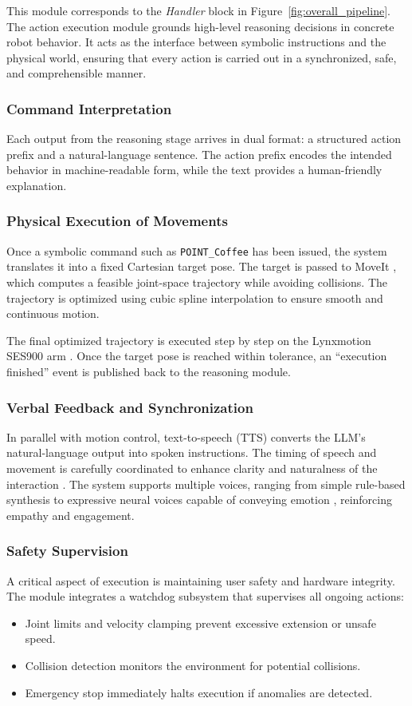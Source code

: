 This module corresponds to the \textit{Handler} block in Figure~\ref{fig:overall_pipeline}. The action execution module grounds high-level reasoning decisions in concrete robot behavior. It acts as the interface between symbolic instructions and the physical world, ensuring that every action is carried out in a synchronized, safe, and comprehensible manner.

\subsubsection{Command Interpretation}
Each output from the reasoning stage arrives in dual format: a structured action prefix and a natural-language sentence. The action prefix encodes the intended behavior in machine-readable form, while the text provides a human-friendly explanation.

\subsubsection{Physical Execution of Movements}
Once a symbolic command such as \texttt{POINT\_Coffee} has been issued, the system translates it into a fixed Cartesian target pose. The target is passed to MoveIt \cite{ref31}, which computes a feasible joint-space trajectory while avoiding collisions. The trajectory is optimized using cubic spline interpolation \cite{ref32} to ensure smooth and continuous motion.

The final optimized trajectory is executed step by step on the Lynxmotion SES900 arm \cite{ref33}. Once the target pose is reached within tolerance, an ``execution finished'' event is published back to the reasoning module.

\subsubsection{Verbal Feedback and Synchronization}
In parallel with motion control, text-to-speech (TTS) converts the LLM's natural-language output into spoken instructions. The timing of speech and movement is carefully coordinated to enhance clarity and naturalness of the interaction \cite{ref34}. The system supports multiple voices, ranging from simple rule-based synthesis to expressive neural voices capable of conveying emotion \cite{ref35}, reinforcing empathy and engagement.

\subsubsection{Safety Supervision}
A critical aspect of execution is maintaining user safety and hardware integrity. The module integrates a watchdog subsystem that supervises all ongoing actions:
\begin{itemize}
\item Joint limits and velocity clamping prevent excessive extension or unsafe speed.
\item Collision detection monitors the environment for potential collisions.
\item Emergency stop immediately halts execution if anomalies are detected.
\end{itemize}

